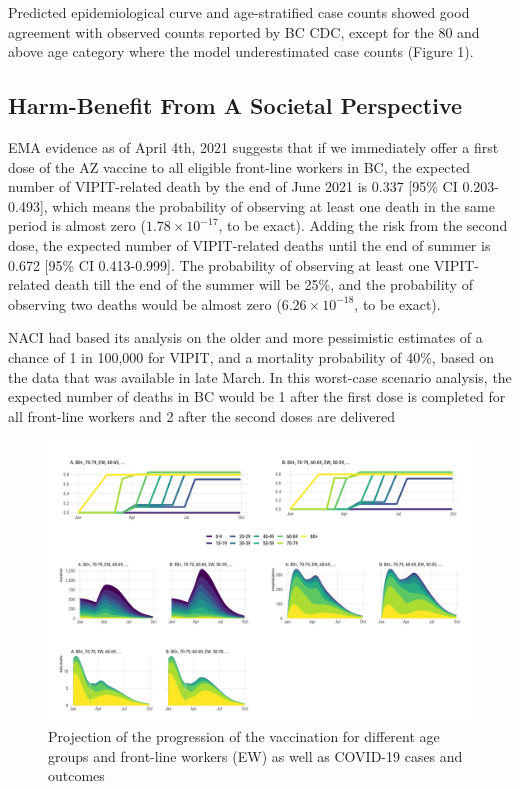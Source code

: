 \documentclass[]{interact}
\theoremstyle{plain}%
\theoremstyle{definition}
\theoremstyle{remark}
\begin{document}
Predicted epidemiological curve and age-stratified case counts showed
good agreement with observed counts reported by BC CDC, except for the
80 and above age category where the model underestimated case counts
(Figure 1).

\hypertarget{harm-benefit-from-a-societal-perspective}{%
\subsection{Harm-Benefit From A Societal
Perspective}\label{harm-benefit-from-a-societal-perspective}}

EMA evidence as of April 4th, 2021 suggests that if we immediately offer
a first dose of the AZ vaccine to all eligible front-line workers in BC,
the expected number of VIPIT-related death by the end of June 2021 is
0.337 {[}95\% CI 0.203-0.493{]}, which means the probability of
observing at least one death in the same period is almost zero
(\ensuremath{1.78\times 10^{-17}}, to be exact). Adding the risk from
the second dose, the expected number of VIPIT-related deaths until the
end of summer is 0.672 {[}95\% CI 0.413-0.999{]}. The probability of
observing at least one VIPIT-related death till the end of the summer
will be 25\%, and the probability of observing two deaths would be
almost zero (\ensuremath{6.26\times 10^{-18}}, to be exact).

NACI had based its analysis on the older and more pessimistic estimates
of a chance of 1 in 100,000 for VIPIT, and a mortality probability of
40\%, based on the data that was available in late March. In this
worst-case scenario analysis, the expected number of deaths in BC would
be 1 after the first dose is completed for all front-line workers and 2
after the second doses are delivered

\begin{figure}

{\centering \includegraphics[width=1\linewidth]{../figures/fig-trajectoriesFull} 

}

\caption{Projection of the progression of the vaccination for different age groups and front-line workers (EW) as well as COVID-19 cases and outcomes}\label{fig:fig1}
\end{figure}
\end{document}
